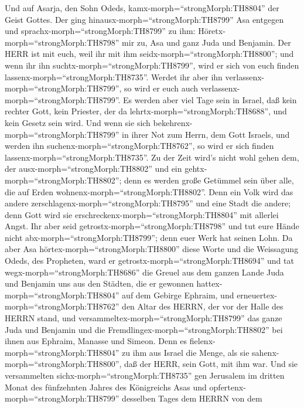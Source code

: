  Und auf Asarja, den Sohn Odeds,
kamx-morph=``strongMorph:TH8804'' der Geist Gottes.  Der
ging hinausx-morph=``strongMorph:TH8799'' Asa entgegen und
sprachx-morph=``strongMorph:TH8799'' zu ihm:
Höretx-morph=``strongMorph:TH8798'' mir zu, Asa und ganz Juda und
Benjamin. Der HERR ist mit euch, weil ihr mit ihm
seidx-morph=``strongMorph:TH8800''; und wenn ihr ihn
suchtx-morph=``strongMorph:TH8799'', wird er sich von euch finden
lassenx-morph=``strongMorph:TH8735''. Werdet ihr aber ihn
verlassenx-morph=``strongMorph:TH8799'', so wird er euch auch
verlassenx-morph=``strongMorph:TH8799''.  Es werden aber
viel Tage sein in Israel, daß kein rechter Gott, kein Priester, der da
lehrtx-morph=``strongMorph:TH8688'', und kein Gesetz sein wird.
 Und wenn sie sich bekehrenx-morph=``strongMorph:TH8799'' in
ihrer Not zum Herrn, dem Gott Israels, und werden ihn
suchenx-morph=``strongMorph:TH8762'', so wird er sich finden
lassenx-morph=``strongMorph:TH8735''.  Zu der Zeit wird's
nicht wohl gehen dem, der ausx-morph=``strongMorph:TH8802'' und ein
gehtx-morph=``strongMorph:TH8802''; denn es werden große Getümmel sein
über alle, die auf Erden wohnenx-morph=``strongMorph:TH8802''.
 Denn ein Volk wird das andere
zerschlagenx-morph=``strongMorph:TH8795'' und eine Stadt die andere;
denn Gott wird sie erschreckenx-morph=``strongMorph:TH8804'' mit
allerlei Angst.  Ihr aber seid
getrostx-morph=``strongMorph:TH8798'' und tut eure Hände nicht
abx-morph=``strongMorph:TH8799''; denn euer Werk hat seinen Lohn.
 Da aber Asa hörtex-morph=``strongMorph:TH8800'' diese Worte
und die Weissagung Odeds, des Propheten, ward er
getrostx-morph=``strongMorph:TH8694'' und tat
wegx-morph=``strongMorph:TH8686'' die Greuel aus dem ganzen Lande Juda
und Benjamin uns aus den Städten, die er gewonnen
hattex-morph=``strongMorph:TH8804'' auf dem Gebirge Ephraim, und
erneuertex-morph=``strongMorph:TH8762'' den Altar des HERRN, der vor der
Halle des HERRN stand,  und
versammeltex-morph=``strongMorph:TH8799'' das ganze Juda und Benjamin
und die Fremdlingex-morph=``strongMorph:TH8802'' bei ihnen aus Ephraim,
Manasse und Simeon. Denn es fielenx-morph=``strongMorph:TH8804'' zu ihm
aus Israel die Menge, als sie sahenx-morph=``strongMorph:TH8800'', daß
der HERR, sein Gott, mit ihm war.  Und sie versammelten
sichx-morph=``strongMorph:TH8735'' gen Jerusalem im dritten Monat des
fünfzehnten Jahres des Königreichs Asas  und
opfertenx-morph=``strongMorph:TH8799'' desselben Tages dem HERRN von dem
